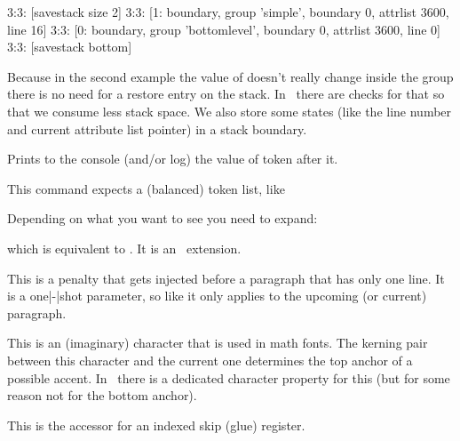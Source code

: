 3:3: [savestack size 2]
3:3: [1: boundary, group 'simple', boundary 0, attrlist 3600, line 16]
3:3: [0: boundary, group 'bottomlevel', boundary 0, attrlist 3600, line 0]
3:3: [savestack bottom]
\stoptyping

Because in the second example the value of \type {\scratchcounter} doesn't really
change inside the group there is no need for a restore entry on the stack. In
\LUAMETATEX\ there are checks for that so that we consume less stack space. We
also store some states (like the line number and current attribute list pointer)
in a stack boundary.

\stopoldprimitive

\startoldprimitive[title={\prm {showthe}}]

Prints to the console (and/or log) the value of token after it.

\stopoldprimitive

\startoldprimitive[title={\prm {showtokens}}]

This command expects a (balanced) token list, like

\starttyping
{}
\stoptyping

Depending on what you want to see you need to expand:

\starttyping
\showtokens\expandafter{\the\everypar}
\stoptyping

which is equivalent to \typ {\showthe \everypar}. It is an \ETEX\ extension.

\stopoldprimitive

\startnewprimitive[title={\prm {singlelinepenalty}}]

This is a penalty that gets injected before a paragraph that has only one line.
It is a one|-|shot parameter, so like  it only applies to the
upcoming (or current) paragraph.

\stopnewprimitive

\startoldprimitive[title={\prm {skewchar}}][obsolete=yes]

This is an (imaginary) character that is used in math fonts. The kerning pair
between this character and the current one determines the top anchor of a
possible accent. In \OPENTYPE\ there is a dedicated character property for this
(but for some reason not for the bottom anchor).

\stopoldprimitive

\startoldprimitive[title={\prm {skip}}]

This is the accessor for an indexed skip (glue) register.


